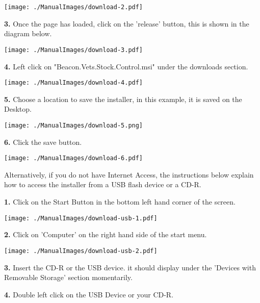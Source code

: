 \texttt{[image: ./ManualImages/download-2.pdf]}

\pagebreak

\textbf{3.} Once the page has loaded, click on the 'release' button, this is shown in the diagram below.

\texttt{[image: ./ManualImages/download-3.pdf]}

\vspace{5mm}

\textbf{4.} Left click on "Beacon.Vets.Stock.Control.msi" under the downloads section. 

\texttt{[image: ./ManualImages/download-4.pdf]}

\vspace{5mm}

\pagebreak

\textbf{5.} Choose a location to save the installer, in this example, it is saved on the Desktop.

\texttt{[image: ./ManualImages/download-5.png]}

\vspace{5mm}

\textbf{6.} Click the save button.

\texttt{[image: ./ManualImages/download-6.pdf]}

\pagebreak

\vspace{5mm}

Alternatively, if you do not have Internet Access, the instructions below explain how to access the installer from a USB flash device or a CD-R.

\textbf{1.} Click on the Start Button in the bottom left hand corner of the screen.

\texttt{[image: ./ManualImages/download-usb-1.pdf]}

\vspace{5mm}

\textbf{2.} Click on 'Computer' on the right hand side of the start menu.

\texttt{[image: ./ManualImages/download-usb-2.pdf]}

\pagebreak

\vspace{5mm}
\textbf{3.} Insert the CD-R or the USB device. it should display under the 'Devices with Removable Storage' section momentarily. 


\vspace{5mm}
\textbf{4.} Double left click on the USB Device or your CD-R.


